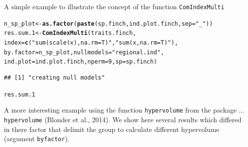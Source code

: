 \documentclass[12pt]{article}\usepackage[]{graphicx}\usepackage[]{color}
\makeatletter
\newcommand{\hlnum}[1]{\textcolor[rgb]{0.686,0.059,0.569}{#1}}%
\newcommand{\hlstr}[1]{\textcolor[rgb]{0.192,0.494,0.8}{#1}}%
\newcommand{\hlstd}[1]{\textcolor[rgb]{0.345,0.345,0.345}{#1}}%
\newcommand{\hlkwb}[1]{\textcolor[rgb]{0.69,0.353,0.396}{#1}}%
\newcommand{\hlkwc}[1]{\textcolor[rgb]{0.333,0.667,0.333}{#1}}%
\newcommand{\hlkwd}[1]{\textcolor[rgb]{0.737,0.353,0.396}{\textbf{#1}}}%
\newenvironment{kframe}{%
 \def\at@end@of@kframe{}%
 \ifinner\ifhmode%
  \def\at@end@of@kframe{\end{minipage}}%
  \begin{minipage}{\columnwidth}%
 \fi\fi%
 \def\FrameCommand##1{\hskip\@totalleftmargin \hskip-\fboxsep
 \colorbox{shadecolor}{##1}\hskip-\fboxsep
     \hskip-\linewidth \hskip-\@totalleftmargin \hskip\columnwidth}%
 \MakeFramed {\advance\hsize-\width
   \@totalleftmargin\z@ \linewidth\hsize
   \@setminipage}}%
 {\par\unskip\endMakeFramed%
 \at@end@of@kframe}
\newenvironment{knitrout}{}{} %
\makeatother
\begin{document}
A simple example to illustrate the concept of the function \texttt{ComIndexMulti}

\begin{knitrout}
\color{fgcolor}\begin{kframe}
\begin{alltt}
\hlstd{n_sp_plot}\hlkwb{<-}\hlkwd{as.factor}\hlstd{(}\hlkwd{paste}\hlstd{(sp.finch, ind.plot.finch,} \hlkwc{sep} \hlstd{=} \hlstr{"_"}\hlstd{))}
\hlstd{res.sum.1}\hlkwb{<-}\hlkwd{ComIndexMulti}\hlstd{(traits.finch,}
              \hlkwc{index} \hlstd{=} \hlkwd{c}\hlstd{(}\hlstr{"sum(scale(x), na.rm = T)"}\hlstd{,} \hlstr{"sum(x, na.rm = T)"}\hlstd{),}
              \hlkwc{by.factor} \hlstd{= n_sp_plot,} \hlkwc{nullmodels} \hlstd{=} \hlstr{"regional.ind"}\hlstd{,}
              \hlkwc{ind.plot} \hlstd{= ind.plot.finch,} \hlkwc{nperm} \hlstd{=} \hlnum{9}\hlstd{,} \hlkwc{sp} \hlstd{= sp.finch)}
\end{alltt}
\begin{verbatim}
## [1] "creating null models"
\end{verbatim}


{\ttfamily\noindent\bfseries\color{errorcolor}{\#\# Error: objet 's' introuvable}}\begin{alltt}
\hlstd{res.sum.1}
\end{alltt}


{\ttfamily\noindent\bfseries\color{errorcolor}{\#\# Error: objet 'res.sum.1' introuvable}}\end{kframe}
\end{knitrout}

\newpage
A more interesting example using the function \texttt{hypervolume} from the package ... \texttt{hypervolume} (Blonder et al., 2014). We show here several results which differed in there factor that delimit the group to calculate different hypervolume (argument \texttt{byfactor}). 
\end{document}
